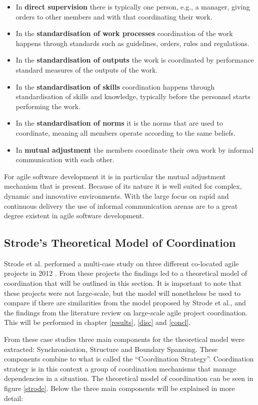 \begin{itemize}
  \item In \textbf{direct supervision} there is typically one person, e.g., a manager, giving orders to other members and with that coordinating their work.
  \item In the \textbf{standardisation of work processes} coordination of the work happens through standards such as guidelines, orders, rules and regulations.
  \item In the \textbf{standardisation of outputs} the work is coordinated by performance standard measures of the outputs of the work.
  \item In the \textbf{standardisation of skills} coordination happens through standardisation of skills and knowledge, typically before the personnel starts performing the work.
  \item In the \textbf{standardisation of norms} it is the norms that are used to coordinate, meaning all members operate according to the same beliefs.
  \item In \textbf{mutual adjustment} the members coordinate their own work by informal communication with each other.
\end{itemize}

For agile software development it is in particular the mutual adjustment mechanism that is present. Because of its nature it is well suited for complex, dynamic and innovative environments. With the large focus on rapid and continuous delivery the use of informal communication arenas are to a great degree existent in agile software development.

\subsection{Strode's Theoretical Model of Coordination}
\label{strodechap}

Strode et al. performed a multi-case study on three different co-located agile projects in 2012 \cite{Strode2012}. From these projects the findings led to a theoretical model of coordination that will be outlined in this section. It is important to note that these projects were not large-scale, but the model will nonetheless be used to compare if there are similarities from the model proposed by Strode et al., and the findings from the literature review on large-scale agile project coordination. This will be performed in chapter \ref{results}, \ref{disc} and \ref{concl}.

From these case studies three main components for the theoretical model were extracted: Synchronisation, Structure and Boundary Spanning. These components combine to what is called the ``Coordination Strategy''. Coordination strategy is in this context a group of coordination mechanisms that manage dependencies in a situation. The theoretical model of coordination can be seen in figure \ref{strode}. Below the three main components will be explained in more detail:

